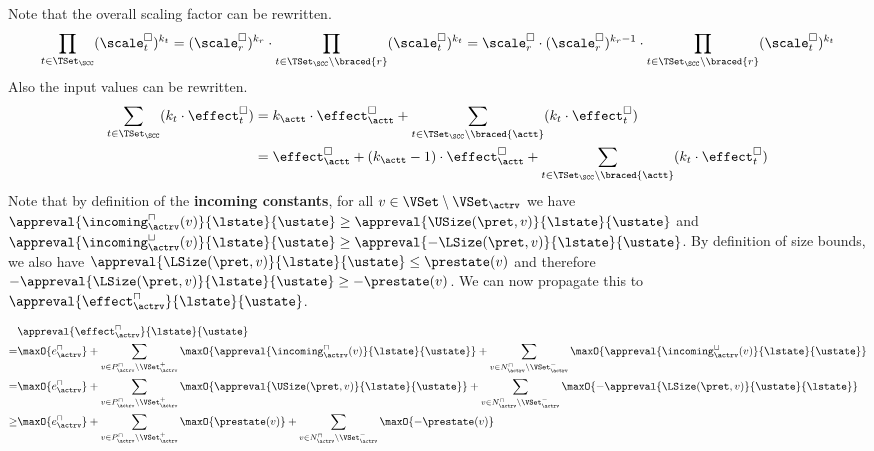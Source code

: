 Note that the overall scaling factor can be rewritten.
\begin{equation} \label{eq:scaling_factor_reduction}
  \prod_{t \in \TSet_\SCC} (\scale^\square_t)^{k_t} = (\scale^\square_r)^{k_r} \cdot \prod_{t \in \TSet_\SCC \setminus \braced{r}} (\scale^\square_t)^{k_t} = \scale^\square_r \cdot (\scale^\square_r)^{k_r - 1} \cdot \prod_{t \in \TSet_\SCC \setminus \braced{r}} (\scale^\square_t)^{k_t}
\end{equation}
Also the input values can be rewritten.
\begin{equation} \label{eq:input_reduction}
  \begin{split}
  \sum_{t \in \TSet_\SCC} (k_t \cdot \effect^\square_t)
  & = k_\actt \cdot \effect^\square_\actt + \sum_{t \in \TSet_\SCC \setminus \braced{\actt}} (k_t \cdot \effect^\square_t) \\
  & = \effect^\square_\actt
    + (k_\actt - 1) \cdot \effect^\square_\actt
    + \sum_{t \in \TSet_\SCC \setminus \braced{\actt}} (k_t \cdot \effect^\square_t)
  \end{split}
\end{equation}
Note that by definition of the \textbf{incoming constants}, for all $v \in \VSet \setminus \VSet_\actrv$ we have $\appreval{\incoming^\sqcap_\actrv(v)}{\lstate}{\ustate} \geq \appreval{\USize(\pret, v)}{\lstate}{\ustate}$ and $\appreval{\incoming^\sqcup_\actrv(v)}{\lstate}{\ustate} \geq \appreval{-\LSize(\pret, v)}{\lstate}{\ustate}$.
By definition of size bounds, we also have $\appreval{\LSize(\pret, v)}{\lstate}{\ustate} \leq \prestate(v)$ and therefore $-\appreval{\LSize(\pret, v)}{\lstate}{\ustate} \geq -\prestate(v)$.
We can now propagate this to $\appreval{\effect^\sqcap_\actrv}{\lstate}{\ustate}$.

\begin{equation} \label{eq:input_rv_reduction_upper}
  \begin{split}
  & \appreval{\effect^\sqcap_\actrv}{\lstate}{\ustate} \\
  = & \maxO{e^{\sqcap}_\actrv}
    + \sum_{v \in P_\actrv^\sqcap \setminus \VSet^+_\actrv} \maxO{\appreval{\incoming^\sqcap_\actrv(v)}{\lstate}{\ustate}}
    + \sum_{v \in N_\actrv^\sqcap \setminus \VSet^-_\actrv} \maxO{\appreval{\incoming^\sqcup_\actrv(v)}{\lstate}{\ustate}} \\
  = & \maxO{e^{\sqcap}_\actrv}
    + \sum_{v \in P_\actrv^\sqcap \setminus \VSet^+_\actrv} \maxO{\appreval{\USize(\pret, v)}{\lstate}{\ustate}}
    + \sum_{v \in N_\actrv^\sqcap \setminus \VSet^-_\actrv} \maxO{-\appreval{\LSize(\pret, v)}{\ustate}{\lstate}} \\
  \geq & \maxO{e^{\sqcap}_\actrv}
    + \sum_{v \in P_\actrv^\sqcap \setminus \VSet^+_\actrv} \maxO{\prestate(v)}
    + \sum_{v \in N_\actrv^\sqcap \setminus \VSet^-_\actrv} \maxO{-\prestate(v)} \\
  \end{split}
\end{equation}

